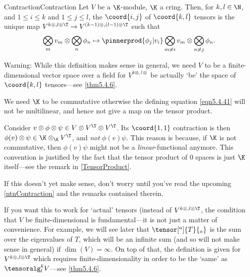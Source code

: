 \begin{dfn}{Contraction}{Contraction}
	Let $V$ be a $\K$-module, $\K$ a cring.  Then, for $k,l\in \N$, and $1\leq i\leq k$ and $1\leq j\leq l$, the $\coord{i,j}$  of $\coord{k,l}$ tensors is the unique map $V^{k\otimes ,l\otimes \T}\rightarrow V^{(k-1)\otimes ,(l-1)\otimes \T}$ such that
	\begin{equation}\label{eqn5.4.41}
		\bigotimes _mv_m\otimes \bigotimes _{n}\phi _n\mapsto \pinnerprod{\phi _j|v_i}\bigotimes _{m\neq i}v_m\otimes \bigotimes _{n\neq j}\phi _n.
	\end{equation}
	\begin{rmk}
		Warning:  While this definition makes sense in general, we need $V$ to be a finite-dimensional vector space over a field for $V^{k\otimes ,l\otimes}$ be actually `be' the space of $\coord{k,l}$ tensors---see \cref{thm5.4.6}.
	\end{rmk}
	\begin{rmk}
		We need $\K$ to be commutative otherwise the defining equation \eqref{eqn5.4.41} will not be multilinear, and hence not give a map on the tensor product.
	\end{rmk}
	\begin{rmk}
		Consider $v\otimes \phi \otimes \psi \in V\otimes V^{\T}\otimes V^{\T}$.  Its $\coord{1,1}$ contraction is then $\phi (v)\otimes \psi \in \K \otimes _{\K}V^{\T}$, and \emph{not} $\phi (v)\psi$.  This reason is because, if $\K$ is not commutative, then $\phi (v)\psi$ might not be a \emph{linear}-functional anymore.  This convention is justified by the fact that the tensor product of $0$ spaces is just $\K$ itself---see the remark in \cref{TensorProduct}.
	\end{rmk}
	\begin{rmk}
		If this doesn't yet make sense, don't worry until you've read the upcoming \cref{ntnContraction} and the remarks contained therein.
	\end{rmk}
	\begin{rmk}
		If you want this to work for `actual' tensors (instead of $V^{k\otimes ,l\otimes \T}$, the condition that $V$ be finite-dimensional is fundamental---it is not just a matter of convenience.  For example, we will see later that $\tensor[^a]{T}{_a}$ is the sum over the eigenvalues of $T$, which will be an infinite sum (and so will not make sense in general) if $\dim (V)=\infty$.  On top of that, the definition is given for $V^{k\otimes ,l\otimes \T}$ which requires finite-dimensionality in order to be the `same' as $\tensoralg _l^kV$---see \cref{thm5.4.6}.
	\end{rmk}
\end{dfn}
